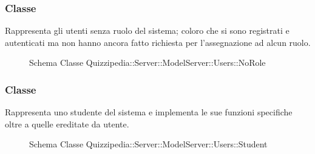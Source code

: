 \subsubsection{Classe }
Rappresenta gli utenti senza ruolo del sistema; coloro che si sono registrati e autenticati ma non hanno ancora fatto richiesta per l'assegnazione ad alcun ruolo.
\begin{figure}[H]
\centering
\noindent{}
\caption[Schema Classe NoRole]{Schema Classe Quizzipedia::Server::ModelServer::Users::NoRole}
\end{figure}
\subsubsection{Classe }
Rappresenta uno studente del sistema e implementa le sue funzioni specifiche oltre a quelle ereditate da utente.
\begin{figure}[H]
\centering
\noindent{}
\caption[Schema Classe Student]{Schema Classe Quizzipedia::Server::ModelServer::Users::Student}
\end{figure}
